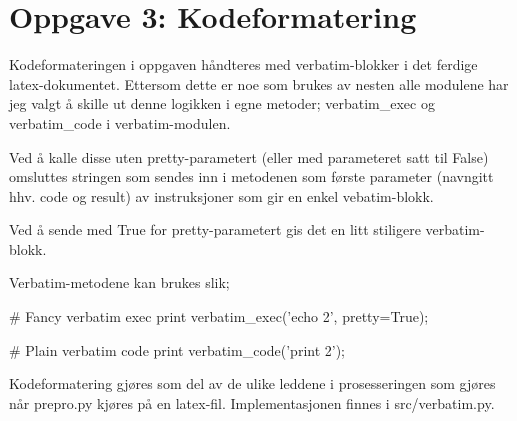 \section*{Oppgave 3: Kodeformatering}

Kodeformateringen i oppgaven håndteres med verbatim-blokker i det ferdige latex-dokumentet. Ettersom dette er noe som brukes av nesten alle modulene har jeg valgt å skille ut denne logikken i egne metoder; verbatim\_exec og verbatim\_code i verbatim-modulen.

Ved å kalle disse uten pretty-parametert (eller med parameteret satt til False) omsluttes stringen som sendes inn i metodenen som første parameter (navngitt hhv. code og result) av instruksjoner som gir en enkel vebatim-blokk.

Ved å sende med True for pretty-parametert gis det en litt stiligere verbatim-blokk.

Verbatim-metodene kan brukes slik;

# Fancy verbatim exec
print verbatim_exec('echo 2', pretty=True);

# Plain verbatim code
print verbatim_code('print 2');

Kodeformatering gjøres som del av de ulike leddene i prosesseringen som gjøres når prepro.py kjøres på en latex-fil. Implementasjonen finnes i src/verbatim.py.